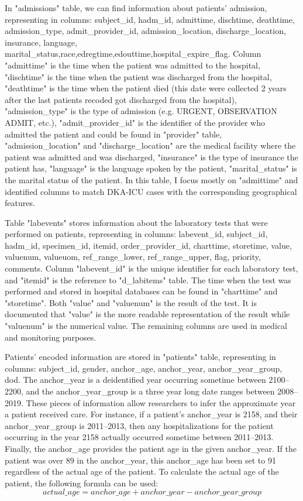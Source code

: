 \documentclass[../main.tex]{subfiles}
\begin{document}
In "admissions" table, we can find information about patients' admission, representing in columns: subject\_id, hadm\_id, admittime, dischtime, deathtime, admission\_type, admit\_provider\_id, admission\_location, discharge\_location, insurance, language, marital\_status,race,edregtime,edouttime,hospital\_expire\_flag.
Column "admittime" is the time when the patient was admitted to the hospital,
"dischtime" is the time when the patient was discharged from the hospital,
"deathtime" is the time when the patient died (this date were collected 2 years after the last patients recoded got discharged from the hospital),
"admission\_type" is the type of admission (e.g. URGENT, OBSERVATION ADMIT, etc.),
"admit\_provider\_id" is the identifier of the provider who admitted the patient and could be found in "provider" table,
"admission\_location" and "discharge\_location" are the medical facility where the patient was admitted and was discharged,
"insurance" is the type of insurance the patient has,
"language" is the language spoken by the patient,
"marital\_status" is the marital status of the patient.
In this table, I focus mostly on "admittime" and identified columns to match DKA-ICU cases with the corresponding geographical features.

Table "labevents" stores information about the laboratory tests that were performed on patients, representing in columns: labevent\_id, subject\_id, hadm\_id, specimen\_id, itemid, order\_provider\_id, charttime, storetime, value, valuenum, valueuom, ref\_range\_lower, ref\_range\_upper, flag, priority, comments.
Column "labevent\_id" is the unique identifier for each laboratory test, and "itemid" is the reference to "d\_labitems" table.
The time when the test was performed and stored in hospital databases can be found in "charttime" and "storetime".
Both "value" and "valuenum" is the result of the test. It is documented that "value" is the more readable representation of the result while "valuenum" is the numerical value.
The remaining columns are used in medical and monitoring purposes. 

Patients' encoded information are stored in "patients" table, representing in columns: subject\_id, gender, anchor\_age, anchor\_year, anchor\_year\_group, dod.
The anchor\_year is a deidentified year occurring sometime between 2100--2200, and the anchor\_year\_group is a three year long date ranges between 2008--2019. 
These pieces of information allow researchers to infer the approximate year a patient received care.
For instance, if a patient's anchor\_year is 2158, and their anchor\_year\_group is 2011--2013, then any hospitalizations for the patient occurring in the year 2158 actually occurred sometime between 2011--2013. 
Finally, the anchor\_age provides the patient age in the given anchor\_year. 
If the patient was over 89 in the anchor\_year, this anchor\_age has been set to 91 regardless of the actual age of the patient.
To calculate the actual age of the patient, the following formula can be used: 
\begin{equation}
    actual\_age = anchor\_age + anchor\_year - anchor\_year\_group
\end{equation}
\end{document}
